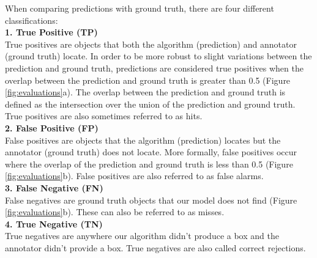\documentclass{article}
\begin{document}
When comparing predictions with ground truth, there are four different classifications: \\

\textbf{1. \hspace{0.25cm} True Positive (TP)}\\
True positives are objects that both the algorithm (prediction) and annotator (ground truth) locate. In order to be more robust to slight variations between the prediction and ground truth, predictions are considered true positives when the overlap between the prediction and ground truth is greater than 0.5 (Figure \ref{fig:evaluations}a). The overlap between the prediction and ground truth is defined as the intersection over the union of the prediction and ground truth. True positives are also sometimes referred to as hits.\\

\textbf{2. \hspace{0.25cm} False Positive (FP)}\\
False positives are objects that the algorithm (prediction) locates but the annotator (ground truth) does not locate. More formally, false positives occur where the overlap of the prediction and ground truth is less than 0.5 (Figure \ref{fig:evaluations}b). False positives are also referred to as false alarms.\\

\textbf{3. \hspace{0.25cm} False Negative (FN)}\\
False negatives are ground truth objects that our model does not find (Figure \ref{fig:evaluations}b). These can also be referred to as misses.\\

\textbf{4. \hspace{0.25cm} True Negative (TN)}\\
True negatives are anywhere our algorithm didn’t produce a box and the annotator didn’t provide a box. True negatives are also called correct rejections.\\
\end{document}
